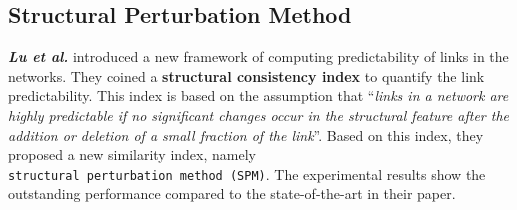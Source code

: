 \subsection{Structural Perturbation Method}

\textbf{\emph{Lu et al.}} introduced a new framework of computing
predictability of links in the networks. They coined a
\textbf{structural consistency index} to quantify the link
predictability. This index is based on the assumption that ``\emph{links
    in a network are highly predictable if no significant changes occur in
    the structural feature after the addition or deletion of a small
    fraction of the link}''. Based on this index, they proposed a new
similarity index, namely
\texttt{structural\ perturbation\ method\ (SPM)}. The experimental
results show the outstanding performance compared to the
state-of-the-art in their paper.